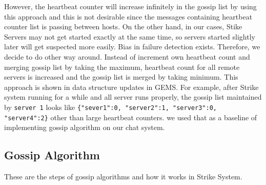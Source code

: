 \documentclass[dareport.tex]{subfiles}
\begin{document}
However, the heartbeat counter will increase infinitely in the gossip list by using this approach and this is not desirable since the messages containing heartbeat counter list is passing between hosts. On the other hand, in our cases, Stike Servers may not get started exactly at the same time, so servers started slightly later will get suspected more easily. Bias in failure detection exists. Therefore, we decide to do other way around. Instead of increment own heartbeat count and merging gossip list by taking the maximum, heartbeat count for all remote servers is increased and the gossip list is merged by taking minimum. This approach is shown in data structure updates in GEMS\cite{gems}. For example, after Strike system running for a while and all server runs properly, the gossip list maintained by \verb|server 1| looks like \verb|{"sever1":0, "server2":1, "server3":0, "server4":2}| other than large heartbeat counters. we used that as a baseline of implementing gossip algorithm on our chat system. 

\subsection{Gossip Algorithm}
These are the steps of gossip algorithms and how it works in Strike System.
\end{document}
